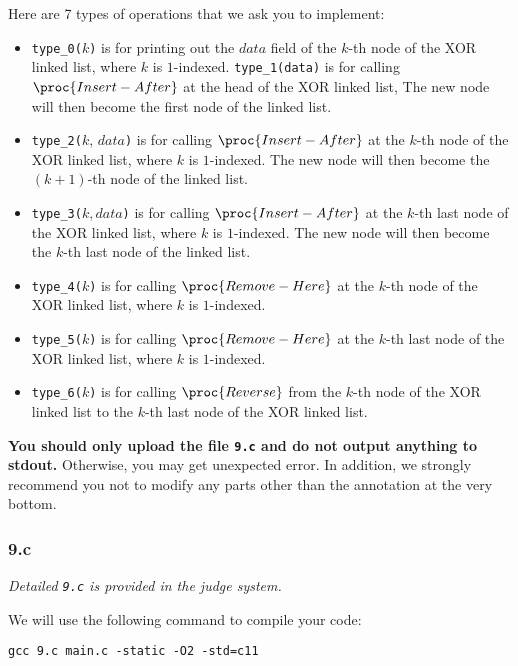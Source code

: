 Here are 7 types of operations that we ask you to implement:

\begin{itemize}
    \item \texttt{type\_0(}$k$\texttt{)} is for printing out the $data$ field of the $k$-th node of the XOR linked list, where $k$ is $1$-indexed.
    \texttt{type\_1(data)} is for calling $\proc{Insert-After}$ at the head of the XOR linked list, The new node will then become the first node of the linked list.
    \item \texttt{type\_2(}$k,\, data$\texttt{)} is for calling $\proc{Insert-After}$ at the $k$-th node of the XOR linked list, where $k$ is $1$-indexed. The new node will then become the $(k+1)$-th node of the linked list.
    \item \texttt{type\_3(}$k,data$\texttt{)} is for calling $\proc{Insert-After}$ at the $k$-th last node of the XOR linked list, where $k$ is $1$-indexed. The new node will then become the $k$-th last node of the linked list.
    \item \texttt{type\_4(}$k$\texttt{)} is for calling $\proc{Remove-Here}$ at the $k$-th node of the XOR linked list, where $k$ is $1$-indexed.
    \item \texttt{type\_5(}$k$\texttt{)} is for calling $\proc{Remove-Here}$ at the $k$-th last node of the XOR linked list, where $k$ is $1$-indexed. 
    \item \texttt{type\_6(}$k$\texttt{)} is for calling $\proc{Reverse}$ from the $k$-th node of the XOR linked list to the $k$-th last node of the XOR linked list.
\end{itemize}

\noindent\textbf{You should only upload the file \texttt{9.c} and do not output anything to stdout.} Otherwise, you may get unexpected error. In addition, we strongly recommend you not to modify any parts other than the annotation at the very bottom. 

\subsubsection{9.c}\label{9.c}

{\it Detailed \texttt{9.c} is provided in the judge system.}

\bigskip

\noindent We will use the following command to compile your code:

\begin{center}
\texttt{gcc 9.c main.c -static -O2 -std=c11}
\end{center}

